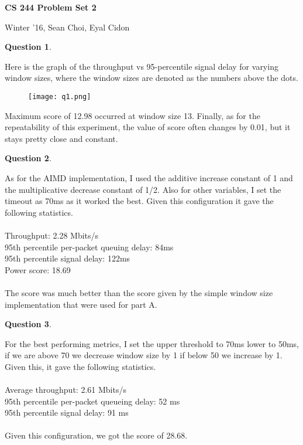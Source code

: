 \documentclass[11pt]{article}
\title{}
\author{}
\date{}
\newtheorem{pb}{Question}
\begin{document}
\begin{flushleft}
\textbf{\Large{CS 244 Problem Set 2}}
\begin{flushright} Winter '16, Sean Choi, Eyal Cidon
\end{flushright}
\end{flushleft}

\begin{pb}
\end{pb}
Here is the graph of the throughput vs 95-percentile signal delay for varying window sizes, where the window sizes are denoted as the numbers above the dots.
\begin{figure}[ht!]
\centering
\texttt{[image: q1.png]}
\end{figure}
Maximum score of 12.98 occurred at window size 13. Finally, as for the repeatability of this experiment, the value of score often changes by 0.01, but it stays pretty close and constant. 


\begin{pb}
\end{pb}

As for the AIMD implementation, I used the additive increase constant of 1 and the multiplicative decrease constant of 1/2. Also for other variables, I set the timeout as 70ms as it worked the best. Given this configuration it gave the following statistics.\\
\\
Throughput: 2.28 Mbits/s \\
95th percentile per-packet queuing delay: 84ms\\
95th percentile signal delay: 122ms\\
Power score: 18.69\\
\\
The score was much better than the score given by the simple window size implementation that were used for part A.
\begin{pb}
\end{pb}
For the best performing metrics, I set the upper threshold to 70ms lower to 50ms, if we are above 70 we decrease window size by 1 if below 50 we increase by 1. Given this, it gave the following statistics.\\
\\
Average throughput: 2.61 Mbits/s \\
95th percentile per-packet queueing delay: 52 ms\\
95th percentile signal delay: 91 ms\\
\\
Given this configuration, we got the score of 28.68.
\end{document}
